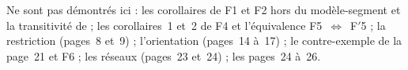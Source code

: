 Ne sont pas démontrés ici : les corollaires de F1 et F2 hors du modèle-segment et la transitivité de  ; les corollaires~1 et~2 de F4 et l'équivalence F5~$\Leftrightarrow$~F$'$5 ; la restriction (pages~8 et~9) ; l'orientation (pages~14 à~17) ; le contre-exemple de la page~21 et F6 ; les réseaux (pages~23 et~24) ; les pages~24 à~26.
